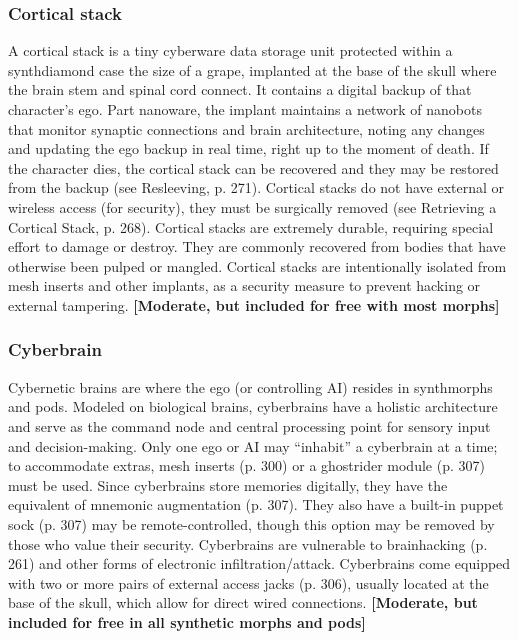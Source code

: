 \subsubsection{Cortical stack} A cortical stack is a tiny cyberware data storage unit protected within a synthdiamond case the size of a grape, implanted at the base of the skull where the brain stem and spinal cord connect. It contains a digital backup of that character’s ego. Part nanoware, the implant maintains a network of nanobots that monitor synaptic connections and brain architecture, noting any changes and updating the ego backup in real time, right up to the moment of death. If the character dies, the cortical stack can be recovered and they may be restored from the backup (see Resleeving, p. 271). Cortical stacks do not have external or wireless access (for security), they must be surgically removed (see Retrieving a Cortical Stack, p. 268). Cortical stacks are extremely durable, requiring special effort to damage or destroy. They are commonly recovered from bodies that have otherwise been pulped or mangled. Cortical stacks are intentionally isolated from mesh inserts and other implants, as a security measure to prevent hacking or external tampering. \textbf{[Moderate, but included for free with most morphs]} 

\subsubsection{Cyberbrain} 

Cybernetic brains are where the ego (or controlling AI) resides in synthmorphs and pods. Modeled on biological brains, cyberbrains have a holistic architecture and serve as the command node and central processing point for sensory input and decision-making. Only one ego or AI may ``inhabit'' a cyberbrain at a time; to accommodate extras, mesh inserts (p. 300) or a ghostrider module (p. 307) must be used. Since cyberbrains store memories digitally, they have the equivalent of mnemonic augmentation (p. 307). They also have a built-in puppet sock (p. 307) may be remote-controlled, though this option may be removed by those who value their security. Cyberbrains are vulnerable to brainhacking (p. 261) and other forms of electronic infiltration/attack. Cyberbrains come equipped with two or more pairs of external access jacks (p. 306), usually located at the base of the skull, which allow for direct wired connections. \textbf{[Moderate, but included for free in all synthetic morphs and pods]} 

